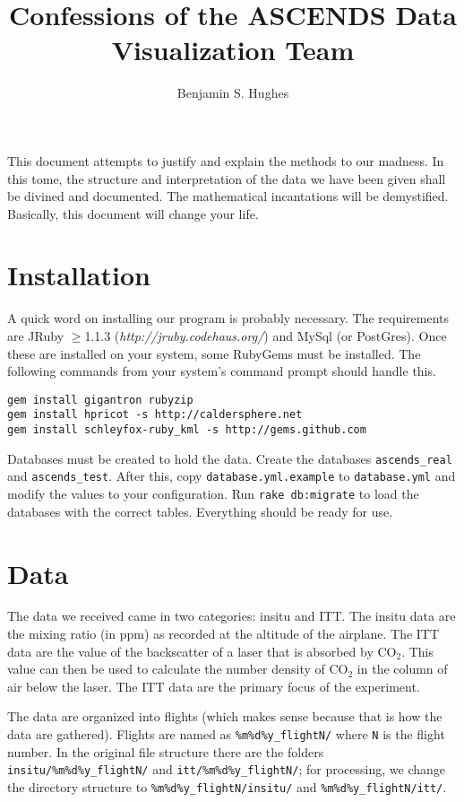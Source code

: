 \documentclass[12pt]{article}
\begin{document}
\author{Benjamin S. Hughes}
\title{Confessions of the ASCENDS Data Visualization Team}
\maketitle

This document attempts to justify and explain the methods to our madness.  In this tome, the structure and interpretation of the data we have been given shall be divined and documented.  The mathematical incantations will be demystified.  Basically, this document will change your life.

\section*{Installation}

A quick word on installing our program is probably necessary.  The requirements are JRuby $\geq$1.1.3 (\textit{http://jruby.codehaus.org/}) and MySql (or PostGres).  Once these are installed on your system, some RubyGems must be installed.  The following commands from your system's command prompt should handle this.

\begin{Verbatim}
gem install gigantron rubyzip
gem install hpricot -s http://caldersphere.net
gem install schleyfox-ruby_kml -s http://gems.github.com
\end{Verbatim}

Databases must be created to hold the data.  Create the databases \texttt{ascends\_real} and \texttt{ascends\_test}.  After this, copy \texttt{database.yml.example} to \texttt{database.yml} and modify the values to your configuration.  Run \texttt{rake db:migrate} to load the databases with the correct tables.  Everything should be ready for use.

\section*{Data}

The data we received came in two categories: insitu and ITT.  The insitu data are the mixing ratio (in ppm) as recorded at the altitude of the airplane. The ITT data are the value of the backscatter of a laser that is absorbed by CO$_2$. This value can then be used to calculate the number density of CO$_2$ in the column of air below the laser.  The ITT data are the primary focus of the experiment.

The data are organized into flights (which makes sense because that is how the data are gathered).  Flights are named as \texttt{\%m\%d\%y\_flightN/} where \texttt{N} is the flight number.  In the original file structure there are the folders \texttt{insitu/\%m\%d\%y\_flightN/} and \texttt{itt/\%m\%d\%y\_flightN/}; for processing, we change the directory structure to \texttt{\%m\%d\%y\_flightN/insitu/} and \texttt{\%m\%d\%y\_flightN/itt/}.
\end{document}
